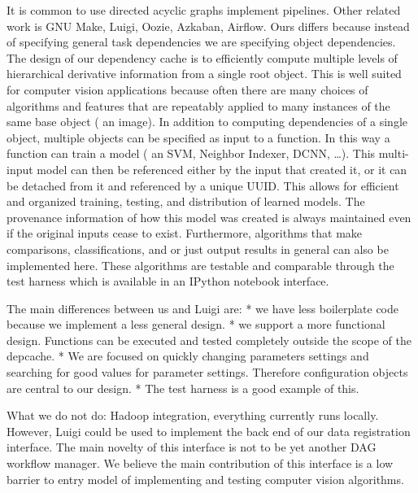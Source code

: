     It is common to use directed acyclic graphs implement pipelines.
    Other related work is GNU Make, Luigi, Oozie, Azkaban, Airflow.
    Ours differs because instead of specifying general task
      dependencies we are specifying object dependencies.
    The design of our dependency cache is to efficiently compute
      multiple levels of hierarchical derivative information from a
      single root object.
    This is well suited for computer vision applications because often
      there are many choices of algorithms and features that are
      repeatably applied to many instances of the same base object
      (\eg{} an image).
    In addition to computing dependencies of a single object, multiple
      objects can be specified as input to a function.
    In this way a function can train a model (\eg{} an SVM, Neighbor
      Indexer, DCNN, \ldots).
    This multi-input model can then be referenced either by the input
      that created it, or it can be detached from it and referenced by a
      unique UUID{}.
    This allows for efficient and organized training, testing, and
      distribution of learned models.
    The provenance information of how this model was created is always
      maintained even if the original inputs cease to exist.
    Furthermore, algorithms that make comparisons, classifications,
      and or just output results in general can also be implemented
      here.
    These algorithms are testable and comparable through the test
      harness which is available in an IPython notebook interface.

    The main differences between us and Luigi are:
    * we have less boilerplate code because we implement a less
      general design.
    * we support a more functional design.
    Functions can be executed and tested completely outside the scope
      of the depcache.
    * We are focused on quickly changing parameters settings and
      searching for good values for parameter settings.
    Therefore configuration objects are central to our design.
    * The test harness is a good example of this.
       
    What we do not do:
    Hadoop integration, everything currently runs locally.
    However, Luigi could be used to implement the back end of our data
      registration interface.
    The main novelty of this interface is not to be yet another DAG
      workflow manager.
    We believe the main contribution of this interface is a low
      barrier to entry model of implementing and testing computer vision
      algorithms.

